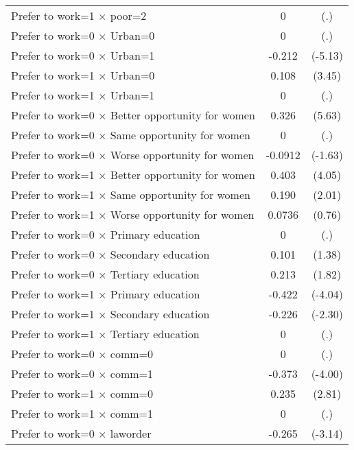 {\begin{longtable}{l*{1}{cc}}
Prefer to work=1 $\times$ poor=2&           0         &         (.)\\
Prefer to work=0 $\times$ Urban=0&           0         &         (.)\\
Prefer to work=0 $\times$ Urban=1&      -0.212\sym{***}&     (-5.13)\\
Prefer to work=1 $\times$ Urban=0&       0.108\sym{***}&      (3.45)\\
Prefer to work=1 $\times$ Urban=1&           0         &         (.)\\
Prefer to work=0 $\times$ Better opportunity for women&       0.326\sym{***}&      (5.63)\\
Prefer to work=0 $\times$ Same opportunity for women&           0         &         (.)\\
Prefer to work=0 $\times$ Worse opportunity for women&     -0.0912         &     (-1.63)\\
Prefer to work=1 $\times$ Better opportunity for women&       0.403\sym{***}&      (4.05)\\
Prefer to work=1 $\times$ Same opportunity for women&       0.190\sym{*}  &      (2.01)\\
Prefer to work=1 $\times$ Worse opportunity for women&      0.0736         &      (0.76)\\
Prefer to work=0 $\times$ Primary education&           0         &         (.)\\
Prefer to work=0 $\times$ Secondary education&       0.101         &      (1.38)\\
Prefer to work=0 $\times$ Tertiary education&       0.213         &      (1.82)\\
Prefer to work=1 $\times$ Primary education&      -0.422\sym{***}&     (-4.04)\\
Prefer to work=1 $\times$ Secondary education&      -0.226\sym{*}  &     (-2.30)\\
Prefer to work=1 $\times$ Tertiary education&           0         &         (.)\\
Prefer to work=0 $\times$ comm=0&           0         &         (.)\\
Prefer to work=0 $\times$ comm=1&      -0.373\sym{***}&     (-4.00)\\
Prefer to work=1 $\times$ comm=0&       0.235\sym{**} &      (2.81)\\
Prefer to work=1 $\times$ comm=1&           0         &         (.)\\
Prefer to work=0 $\times$ laworder&      -0.265\sym{**} &     (-3.14)\\

\end{longtable}}
